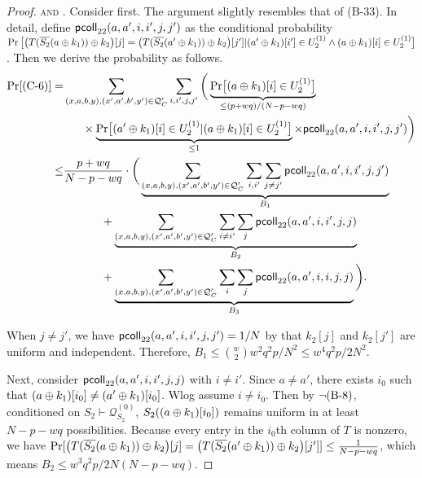 \begin{proof}
\noindent\textsc{\csix and \cnine}. Consider \csix first. The argument slightly resembles that of (B-33). In detail, define $\mathsf{pcoll}_{22}(a,a',i,i',j,j')$ as the conditional probability $\Pr\big[\big(T(\overline{S_2}(a\oplus k_1))\oplus k_2\big)[j]=\big(T(\overline{S_2}(a'\oplus k_1))\oplus k_2\big)[j']|   
(a' \oplus k_1)[i']\in U_2^{(1)}\wedge(a \oplus k_1)[i]\in U_2^{(1)}\big]$. Then we derive the probability as follows.       
%
\begin{align*}
\Pr[\text{(C-6)}] 
=   &  \sum_{(x,a,b,y),(x',a',b',y')\in\mathcal{Q}_{C}'}\sum_{i,i',j,j'}\bigg(\underbrace{{\Pr}\big[(a\oplus k_1)[i]\in U_2^{(1)}\big]}_{\leq(p+wq)/(N-p-wq)}     \\
& \ \ \ \ \ \times
\underbrace{{\Pr}\big[(a'\oplus k_1)[i]\in U_2^{(1)}|(a\oplus k_1)[i]\in U_2^{(1)}\big]}_{\leq1}\times\mathsf{pcoll}_{22}(a,a',i,i',j,j') \bigg)      \\
\leq  &  \frac{p+wq}{N-p-wq}\cdot\bigg(
\underbrace{\sum_{(x,a,b,y),(x',a',b',y')\in\mathcal{Q}_{C}'}\sum_{i,i'}\sum_{j\neq j'}\mathsf{pcoll}_{22}(a,a',i,i',j,j')}_{B_1}     \\
& \ \ \ \ \ \ \ \ \ \    +  
\underbrace{\sum_{(x,a,b,y),(x',a',b',y')\in\mathcal{Q}_{C}'}\sum_{i\neq i'}\sum_{j}\mathsf{pcoll}_{22}(a,a',i,i',j,j)}_{B_2}      \\ 
& \ \ \ \ \ \ \ \ \ \    +  \underbrace{\sum_{(x,a,b,y),(x',a',b',y')\in\mathcal{Q}_{C}'}\sum_{i}\sum_{j}\mathsf{pcoll}_{22}(a,a',i,i,j,j)}_{B_3}\bigg)     .
\end{align*}
%
%

When $j\neq j'$, we have $\mathsf{pcoll}_{22}(a,a',i,i',j,j')=1/N$ by that $k_2[j]$ and $k_2[j']$ are uniform and independent. Therefore, $B_1\leq{w\choose2}w^2q^2p/N^2\leq w^4q^2p/2N^2$.


Next, consider $\mathsf{pcoll}_{22}(a,a',i,i',j,j)$ with $i\neq i'$. Since $a\neq a'$, there exists $i_0$ such that $(a\oplus k_1)[i_0]\neq(a'\oplus k_1)[i_0]$. Wlog assume $i\neq i_0$. Then by $\neg\text{(B-8)}$, conditioned on $S_2\vdash\mathcal{Q}_{S_2}^{(0)}$, $S_2((a\oplus k_1)[i_0])$ remains uniform in at least $N-p-wq$ possibilities. Because every entry in the $i_0$th column of $T$ is nonzero, we have ${\Pr}[\big(T(\overline{S_2}(a\oplus k_1))\oplus k_2\big)[j]=\big(T(\overline{S_2}(a'\oplus k_1))\oplus k_2\big)[j']]\leq\frac{1}{N-p-wq}$, which means $B_2\leq w^3q^2p/2N(N-p-wq)$.




\end{proof}
